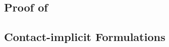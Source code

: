 \appendix

\subsection{Proof of~}\label{sec:proof-of-local-convergency}

\subsection{Contact-implicit Formulations}\label{sec:contact-implicit-formulation-for-experimental-tasks}



